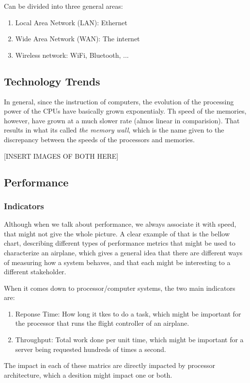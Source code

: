 \documentclass{article}
\begin{document}
Can be divided into three general areas:
\begin{enumerate}
    \item Local Area Network (LAN): Ethernet
    \item Wide Area Network (WAN): The internet
    \item Wireless network: WiFi, Bluetooth, ...
\end{enumerate}

\subsection*{Technology Trends}
In general, since the instruction of computers, the evolution of the processing power of the CPUs have basically grown exponentialy. Th speed of the memories, however, have grown at a much slower rate (almos linear in comparision). That results in what its called \emph{the memory wall}, which is the name given to the discrepancy between the speeds of the processors and memories.

[INSERT IMAGES OF BOTH HERE]

\subsection*{Performance}
\subsubsection*{Indicators}
Although when we talk about performance, we always associate it with speed, that might not give the whole picture. A clear example of that is the bellow chart, describing different types of performance metrics that might be used to characterize an airplane, which gives a general idea that there are different ways of measuring how a system behaves, and that each might be interesting to a different stakeholder.

When it comes down to processor/computer systems, the two main indicators are:
\begin{enumerate}
    \item Reponse Time: How long it tkes to do a task, which might be important for the processor that runs the flight controller of an airplane.
    \item Throughput: Total work done per unit time, which might be important for a server being requested hundreds of times a second.
\end{enumerate}

The impact in each of these matrics are directly impacted by processor architecture, which a desition might impact one or both.
\end{document}
